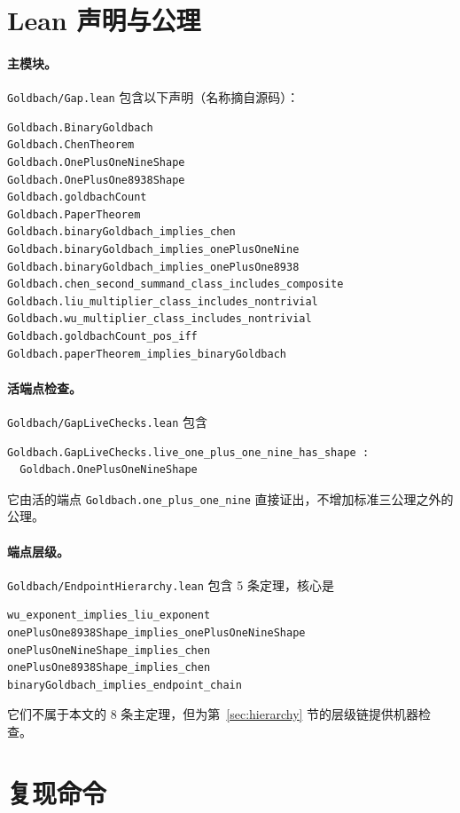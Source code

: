 \documentclass[11pt,a4paper]{ctexart}
\theoremstyle{plain}
\theoremstyle{definition}
\begin{document}
\appendix

\section{Lean 声明与公理}
\label{app:lean}

\paragraph{主模块。}
\texttt{Goldbach/Gap.lean} 包含以下声明（名称摘自源码）：

\begin{verbatim}
Goldbach.BinaryGoldbach
Goldbach.ChenTheorem
Goldbach.OnePlusOneNineShape
Goldbach.OnePlusOne8938Shape
Goldbach.goldbachCount
Goldbach.PaperTheorem
Goldbach.binaryGoldbach_implies_chen
Goldbach.binaryGoldbach_implies_onePlusOneNine
Goldbach.binaryGoldbach_implies_onePlusOne8938
Goldbach.chen_second_summand_class_includes_composite
Goldbach.liu_multiplier_class_includes_nontrivial
Goldbach.wu_multiplier_class_includes_nontrivial
Goldbach.goldbachCount_pos_iff
Goldbach.paperTheorem_implies_binaryGoldbach
\end{verbatim}

\paragraph{活端点检查。}
\texttt{Goldbach/GapLiveChecks.lean} 包含
\begin{verbatim}
Goldbach.GapLiveChecks.live_one_plus_one_nine_has_shape :
  Goldbach.OnePlusOneNineShape
\end{verbatim}
它由活的端点 \texttt{Goldbach.one\_plus\_one\_nine} 直接证出，不增加标准三公理之外的公理。

\paragraph{端点层级。}
\texttt{Goldbach/EndpointHierarchy.lean} 包含 5 条定理，核心是
\begin{verbatim}
wu_exponent_implies_liu_exponent
onePlusOne8938Shape_implies_onePlusOneNineShape
onePlusOneNineShape_implies_chen
onePlusOne8938Shape_implies_chen
binaryGoldbach_implies_endpoint_chain
\end{verbatim}
它们不属于本文的 8 条主定理，但为第~\ref{sec:hierarchy} 节的层级链提供机器检查。

\section{复现命令}
\label{app:reproduce}
\end{document}
